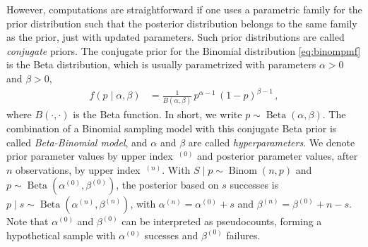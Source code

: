 \documentclass[runningheads,a4paper]{llncs}
\newcommand{\uz}{^{(0)}} %
\newcommand{\un}{^{(n)}} %
\newcommand{\az}{\alpha\uz}
\newcommand{\an}{\alpha\un}
\newcommand{\bz}{\beta\uz}
\newcommand{\bn}{\beta\un}
\newcommand{\bin}{\operatorname{Binom}} %
\newcommand{\be}{\operatorname{Beta}}   %
\begin{document}
However, computations are straightforward if one uses a parametric family for the prior distribution such that
the posterior distribution belongs to the same family as the prior, just with updated parameters.
Such prior distributions are called \emph{conjugate} priors.
The conjugate prior for the Binomial distribution \eqref{eq:binompmf} is the Beta distribution,
which is usually parametrized with parameters $\alpha > 0$ and $\beta > 0$,
\begin{align}
f(p\mid\alpha,\beta) &= \frac{1}{B(\alpha,\beta)}\, p^{\alpha-1}\, (1-p)^{\beta-1}\,,
\label{eq:betadensab}
\end{align}
where $B(\cdot,\cdot)$ is the Beta function.
In short, we write $p \sim \be(\alpha,\beta)$.
The combination of a Binomial sampling model with this conjugate Beta prior is called \emph{Beta-Binomial model},
and $\alpha$ and $\beta$ are called \emph{hyperparameters}.
We denote prior parameter values by upper index~${}\uz$ and posterior parameter values, after $n$ observations,
by upper index~${}\un$.
With $S\mid p \sim \bin(n,p)$ and $p \sim \be(\az,\bz)$, the posterior based on $s$ successes is $p \mid s \sim \be(\an,\bn)$,
with
$\an = \az + s$ and $\bn= \bz + n - s$.
Note that $\az$ and $\bz$ can be interpreted as pseudocounts,
forming a hypothetical sample with $\az$ sucesses and $\bz$ failures.
\end{document}
